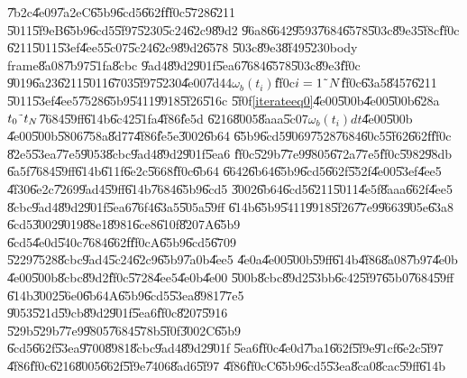 \documentclass[12pt,a4paper]{article}
\begin{document}
\U{7b2c}\U{4e09}\U{7a2e}C\U{65b9}\U{6cd5}\U{662f}\U{ff0c}\U{5728}\U{6211}%
\U{5011}\U{5f9e}B\U{65b9}\U{6cd5}\U{5f97}\U{5230}\U{5c24}\U{62c9}\U{89d2}%
\U{96a8}\U{6642}\U{9593}\U{7684}\U{6578}\U{503c}\U{89e3}\U{5f8c}\U{ff0c}%
\U{6211}\U{5011}\U{53ef}\U{4ee5}\U{5c07}\U{5c24}\U{62c9}\U{89d2}\U{6578}%
\U{503c}\U{89e3}\U{8f49}\U{5230}body frame\U{8a08}\U{7b97}\U{51fa}\U{8cbc}%
\U{9ad4}\U{89d2}\U{901f}\U{5ea6}\U{7684}\U{6578}\U{503c}\U{89e3}\U{ff0c}%
\U{9019}\U{6a23}\U{6211}\U{5011}\U{6703}\U{5f97}\U{5230}\U{4e00}\U{7d44}$%
\omega _{b}(t_{i})$\U{ff0c}$i=1\symbol{126}N$\U{ff0c}\U{63a5}\U{8457}\U{6211}%
\U{5011}\U{53ef}\U{4ee5}\U{7528}\U{65b9}\U{5411}\U{9918}\U{5f26}\U{516c}%
\U{5f0f}\ref{iterateeq0}\U{4e00}\U{500b}\U{4e00}\U{500b}\U{628a}$t_{0}%
\symbol{126}t_{N}$\U{7684}\U{59ff}\U{614b}\U{6c42}\U{51fa}\U{4f86}\U{fe5d}%
\U{6216}\U{8005}\U{8aaa}\U{5c07}$\omega _{b}(t_{i})dt$\U{4e00}\U{500b}%
\U{4e00}\U{500b}\U{5806}\U{758a}\U{8d77}\U{4f86}\U{fe5e}\U{3002}\U{6b64}%
\U{65b9}\U{6cd5}\U{9069}\U{7528}\U{7684}\U{60c5}\U{5f62}\U{662f}\U{ff0c}%
\U{82e5}\U{53ea}\U{77e5}\U{9053}\U{8cbc}\U{9ad4}\U{89d2}\U{901f}\U{5ea6}%
\U{ff0c}\U{529b}\U{77e9}\U{9805}\U{672a}\U{77e5}\U{ff0c}\U{5982}\U{98db}%
\U{6a5f}\U{7684}\U{59ff}\U{614b}\U{611f}\U{6e2c}\U{5668}\U{ff0c}\U{6b64}%
\U{6642}\U{6b64}\U{65b9}\U{6cd5}\U{662f}\U{552f}\U{4e00}\U{53ef}\U{4ee5}%
\U{4f30}\U{6e2c}\U{7269}\U{9ad4}\U{59ff}\U{614b}\U{7684}\U{65b9}\U{6cd5}%
\U{3002}\U{6b64}\U{6cd5}\U{6211}\U{5011}\U{4e5f}\U{8aaa}\U{662f}\U{4ee5}%
\U{8cbc}\U{9ad4}\U{89d2}\U{901f}\U{5ea6}\U{76f4}\U{63a5}\U{505a}\U{59ff}%
\U{614b}\U{65b9}\U{5411}\U{9918}\U{5f26}\U{77e9}\U{9663}\U{905e}\U{63a8}%
\U{6cd5}\U{3002}\U{9019}\U{88e1}\U{8981}\U{6ce8}\U{610f}\U{8207}A\U{65b9}%
\U{6cd5}\U{4e0d}\U{540c}\U{7684}\U{662f}\U{ff0c}A\U{65b9}\U{6cd5}\U{6709}%
\U{5229}\U{7528}\U{8cbc}\U{9ad4}\U{5c24}\U{62c9}\U{65b9}\U{7a0b}\U{4ee5}%
\U{4e0a}\U{4e00}\U{500b}\U{59ff}\U{614b}\U{4f86}\U{8a08}\U{7b97}\U{4e0b}%
\U{4e00}\U{500b}\U{8cbc}\U{89d2}\U{ff0c}\U{5728}\U{4ee5}\U{4e0b}\U{4e00}%
\U{500b}\U{8cbc}\U{89d2}\U{53bb}\U{6c42}\U{5f97}\U{65b0}\U{7684}\U{59ff}%
\U{614b}\U{3002}\U{56e0}\U{6b64}A\U{65b9}\U{6cd5}\U{53ea}\U{8981}\U{77e5}%
\U{9053}\U{521d}\U{59cb}\U{89d2}\U{901f}\U{5ea6}\U{ff0c}\U{8207}\U{5916}%
\U{529b}\U{529b}\U{77e9}\U{9805}\U{7684}\U{578b}\U{5f0f}\U{3002}C\U{65b9}%
\U{6cd5}\U{662f}\U{53ea}\U{9700}\U{8981}\U{8cbc}\U{9ad4}\U{89d2}\U{901f}%
\U{5ea6}\U{ff0c}\U{4e0d}\U{7ba1}\U{662f}\U{5f9e}\U{91cf}\U{6e2c}\U{5f97}%
\U{4f86}\U{ff0c}\U{6216}\U{8005}\U{662f}\U{5f9e}\U{7406}\U{8ad6}\U{5f97}%
\U{4f86}\U{ff0c}C\U{65b9}\U{6cd5}\U{53ea}\U{8ca0}\U{8cac}\U{59ff}\U{614b}%
\end{document}
